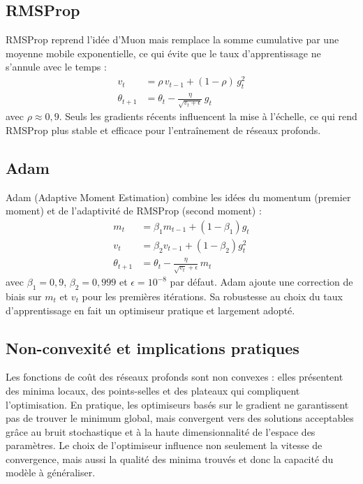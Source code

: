 \documentclass[12pt]{article}
\begin{document}
\subsection{RMSProp}

RMSProp \cite{hinton2012rmsprop} reprend l'idée d'Muon mais remplace la somme cumulative par une moyenne mobile exponentielle, ce qui évite que le taux d'apprentissage ne s'annule avec le temps :
\begin{align}
  v_t &= \rho \, v_{t-1} + (1-\rho) \, g_t^2 \\
  \theta_{t+1} &= \theta_t - \frac{\eta}{\sqrt{v_t + \epsilon}} \, g_t
\end{align}
avec $\rho \approx 0{,}9$. Seuls les gradients récents influencent la mise à l'échelle, ce qui rend RMSProp plus stable et efficace pour l'entraînement de réseaux profonds.

\subsection{Adam}

Adam (Adaptive Moment Estimation) \cite{kingma2014adam} combine les idées du momentum (premier moment) et de l'adaptivité de RMSProp (second moment) :
\begin{align}
  m_t &= \beta_1 m_{t-1} + (1-\beta_1) g_t \\
  v_t &= \beta_2 v_{t-1} + (1-\beta_2) g_t^2 \\
  \theta_{t+1} &= \theta_t - \frac{\eta}{\sqrt{v_t} + \epsilon} \, m_t
\end{align}
avec $\beta_1 = 0{,}9$, $\beta_2 = 0{,}999$ et $\epsilon = 10^{-8}$ par défaut. Adam ajoute une correction de biais sur $m_t$ et $v_t$ pour les premières itérations. Sa robustesse au choix du taux d'apprentissage en fait un optimiseur pratique et largement adopté.

\subsection{Non-convexité et implications pratiques}

Les fonctions de coût des réseaux profonds sont non convexes : elles présentent des minima locaux, des points-selles et des plateaux qui compliquent l'optimisation. En pratique, les optimiseurs basés sur le gradient ne garantissent pas de trouver le minimum global, mais convergent vers des solutions acceptables grâce au bruit stochastique et à la haute dimensionnalité de l'espace des paramètres. Le choix de l'optimiseur influence non seulement la vitesse de convergence, mais aussi la qualité des minima trouvés et donc la capacité du modèle à généraliser.
\end{document}
